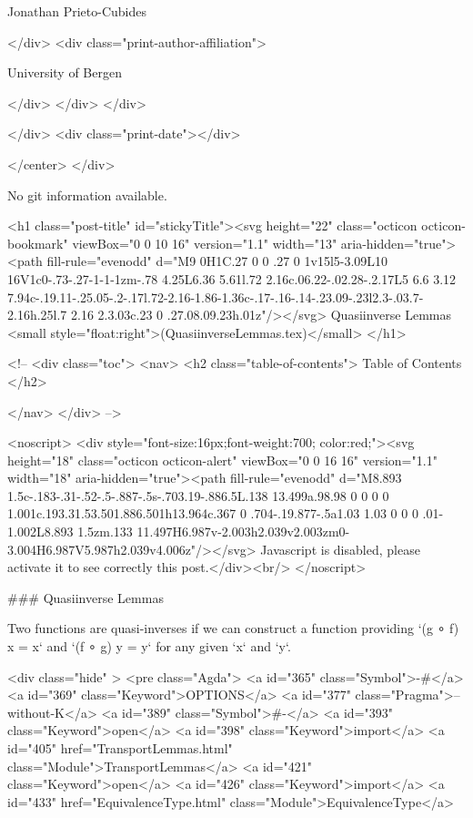                   Jonathan Prieto-Cubides
                
              </div>
              <div class="print-author-affiliation">
                
                  University of Bergen
                
                </div>
            </div>
          </div>
          
          
        </div>
        <div class="print-date"></div>
        
        
    </center>
  </div>

  
  No git information available.
  

  <h1 class="post-title" id="stickyTitle"><svg height="22" class="octicon octicon-bookmark" viewBox="0 0 10 16" version="1.1" width="13" aria-hidden="true"><path fill-rule="evenodd" d="M9 0H1C.27 0 0 .27 0 1v15l5-3.09L10 16V1c0-.73-.27-1-1-1zm-.78 4.25L6.36 5.61l.72 2.16c.06.22-.02.28-.2.17L5 6.6 3.12 7.94c-.19.11-.25.05-.2-.17l.72-2.16-1.86-1.36c-.17-.16-.14-.23.09-.23l2.3-.03.7-2.16h.25l.7 2.16 2.3.03c.23 0 .27.08.09.23h.01z"/></svg> Quasiinverse Lemmas <small style="float:right">(QuasiinverseLemmas.tex)</small>
  </h1>

  <!-- 
  <div class="toc">
    <nav>
    <h2 class="table-of-contents"> Table of Contents </h2>
      

    </nav>
  </div>
   -->

  <noscript>
  <div style="font-size:16px;font-weight:700; color:red;"><svg height="18" class="octicon octicon-alert" viewBox="0 0 16 16" version="1.1" width="18" aria-hidden="true"><path fill-rule="evenodd" d="M8.893 1.5c-.183-.31-.52-.5-.887-.5s-.703.19-.886.5L.138 13.499a.98.98 0 0 0 0 1.001c.193.31.53.501.886.501h13.964c.367 0 .704-.19.877-.5a1.03 1.03 0 0 0 .01-1.002L8.893 1.5zm.133 11.497H6.987v-2.003h2.039v2.003zm0-3.004H6.987V5.987h2.039v4.006z"/></svg> Javascript is disabled, please activate it to see correctly this post.</div><br/>
  </noscript>

  ### Quasiinverse Lemmas

Two functions are quasi-inverses if we can construct a function providing
`(g ∘ f) x = x` and `(f ∘ g) y = y` for any given `x` and `y`.

<div class="hide" >
<pre class="Agda">
<a id="365" class="Symbol">{-#</a> <a id="369" class="Keyword">OPTIONS</a> <a id="377" class="Pragma">--without-K</a> <a id="389" class="Symbol">#-}</a>
<a id="393" class="Keyword">open</a> <a id="398" class="Keyword">import</a> <a id="405" href="TransportLemmas.html" class="Module">TransportLemmas</a>
<a id="421" class="Keyword">open</a> <a id="426" class="Keyword">import</a> <a id="433" href="EquivalenceType.html" class="Module">EquivalenceType</a>

